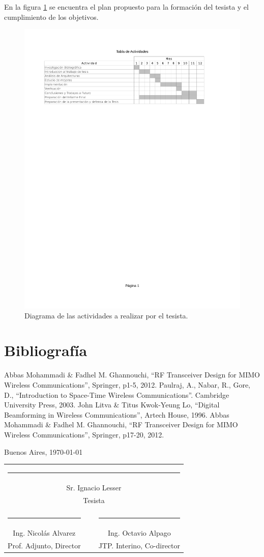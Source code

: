 \documentclass[a4paper]{article}
\newcommand{\signature}[7]{
   \vfill

   \begin{flushright}
      #1, \today
   \end{flushright}
   \vspace{3cm}

   \noindent
   \centering
   \begin{tabularx}{0.9\textwidth}{cXc}
      \multicolumn{3}{c}{\rule{5cm}{1pt}}\\
      \multicolumn{3}{c}{#2}\\
      \multicolumn{3}{c}{#3}\\
      \vspace{3cm}\\
      \rule{5cm}{1pt} & \hspace{2.5cm} & \rule{5cm}{1pt} \\
      #4 & ~ & #5 \\
      #6 & ~ & #7
   \end{tabularx}
   \vspace{1cm}
}
\begin{document}
En la figura \ref{TablaActividades} se encuentra el plan propuesto para la formación del tesista y el cumplimiento de los objetivos.

\begin{figure}[h!]
   \label{TablaActividades}
   \includegraphics[trim = 20mm 200mm 20mm 25mm, clip, width=\textwidth]{tabla_actividades}
   \caption{Diagrama de las actividades a realizar por el tesista.}
\end{figure}

\newpage

\section{Bibliografía}

\begin{thebibliography}{99}

 Abbas Mohammadi \& Fadhel M. Ghannouchi, ``RF Transceiver Design for MIMO Wireless Communications'', Springer, p1-5, 2012.
 Paulraj, A., Nabar, R., Gore, D., ``Introduction to Space-Time Wireless Communications''. Cambridge University Press, 2003.
 John Litva \& Titus Kwok-Yeung Lo, ``Digital Beamforming in Wireless Communications'', Artech House, 1996.
 Abbas Mohammadi \& Fadhel M. Ghannouchi, ``RF Transceiver Design for MIMO Wireless Communications'', Springer, p17-20, 2012.
\end{thebibliography}

\newpage

\signature{Buenos Aires}{Sr. Ignacio Lesser}{Tesista}{Ing. Nicolás Alvarez}{Ing. Octavio Alpago}{Prof. Adjunto, Director}{JTP. Interino, Co-director}
\end{document}
